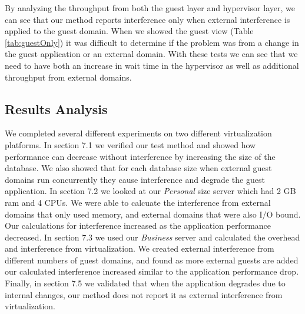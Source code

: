 By analyzing the throughput from both the guest layer and hypervisor layer, we can see that our method reports interference only when external interference is applied to the guest domain.  When we showed the guest view (Table \ref{tab:guestOnly}) it was difficult to determine if the problem was from a change in the guest application or an external domain.  With these tests we can see that we need to have both an increase in wait time in the hypervisor as well as additional throughput from external domains.


\subsection{Results Analysis}
We completed several different experiments on two different virtualization platforms.  In section 7.1 we verified our test method and showed how performance can decrease without interference by increasing the size of the database.  We also showed that for each database size when external guest domains run concurrently they cause interference and degrade the guest application.  In section 7.2 we looked at our \emph{Personal} size server which had 2 GB ram and 4 CPUs.  We were able to calcuate the interference from external domains that only used memory, and external domains that were also I/O bound.  Our calculations for interference increased as the application performance decreased.  In section 7.3 we used our \emph{Business} server and calculated the overhead and interference from virtualization.  We created external interference from different numbers of guest domains, and found as more external guests are added our calculated interference increased similar to the application performance drop.  Finally, in section 7.5 we validated that when the application degrades due to internal changes, our method does not report it as external interference from virtualization.



